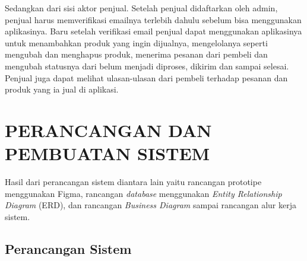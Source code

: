 \par Sedangkan dari sisi aktor penjual. Setelah penjual didaftarkan oleh admin, penjual harus memverifikasi emailnya terlebih dahulu sebelum bisa menggunakan aplikasinya. Baru setelah verifikasi email penjual dapat menggunakan aplikasinya untuk menambahkan produk yang ingin dijualnya, mengelolanya seperti mengubah dan menghapus produk, menerima pesanan dari pembeli dan mengubah statusnya dari belum menjadi diproses, dikirim dan sampai selesai. Penjual juga dapat melihat ulasan-ulasan dari pembeli terhadap pesanan dan produk yang ia jual di aplikasi.

\section{\uppercase{Perancangan dan Pembuatan Sistem}}
Hasil dari perancangan sistem diantara lain yaitu rancangan prototipe menggunakan Figma, rancangan \textit{database} menggunakan \textit{Entity Relationship Diagram} (ERD), dan rancangan \textit{Business Diagram} sampai rancangan alur kerja sistem.

\subsection{Perancangan Sistem}


